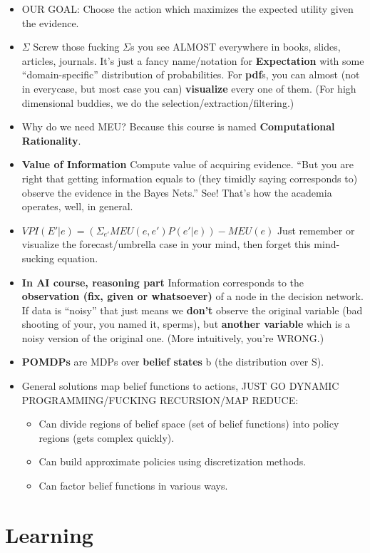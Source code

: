 \documentclass[twocolumn]{article}
\begin{document}
\begin{itemize}
\item OUR GOAL\@: Choose the action which maximizes the expected utility
  given the evidence.
\item \textbf{$\Sigma$} Screw those fucking $\Sigma$s you see ALMOST
  everywhere in books, slides, articles, journals. It's just a fancy
  name/notation for \textbf{Expectation} with some ``domain-specific''
  distribution of probabilities. For \textbf{pdf}s, you can almost
  (not in everycase, but most case you can) \textbf{visualize} every
  one of them. (For high dimensional buddies, we do the
  selection/extraction/filtering.)
\item Why do we need MEU? Because this course is named
  \textbf{Computational Rationality}.
\item \textbf{Value of Information} Compute value of acquiring
  evidence. ``But you are right that getting information equals to
  (they timidly saying corresponds to) observe the evidence in the
  Bayes Nets.'' See! That's how the academia operates, well, in
  general. 
\item $VPI(E'|e)=(\Sigma_{e'}MEU(e,e')P(e'|e))-MEU(e)$ Just remember
  or visualize the forecast/umbrella case in your mind, then forget
  this mind-sucking equation.
\item \textbf{In AI course, reasoning part} Information corresponds to
  the \textbf{observation (fix, given or whatsoever)} of a node in the
  decision network. If data is ``noisy'' that just means we
  \textbf{don't} observe the original variable (bad shooting of your,
  you named it, sperms), but \textbf{another variable} which is a
  noisy version of the original one. (More intuitively, you're WRONG.)
\item \textbf{POMDPs} are MDPs over \textbf{belief states} b (the
  distribution over S).
\item General solutions map belief functions to actions, JUST GO
  DYNAMIC PROGRAMMING/FUCKING RECURSION/MAP REDUCE: 
  \begin{itemize}
  \item Can divide regions of belief space (set of belief functions)
    into policy regions (gets complex quickly).
  \item Can build approximate policies using discretization methods.
  \item Can factor belief functions in various ways.
  \end{itemize}
\end{itemize}
\section{Learning}
\label{sec:learning}
\end{document}
